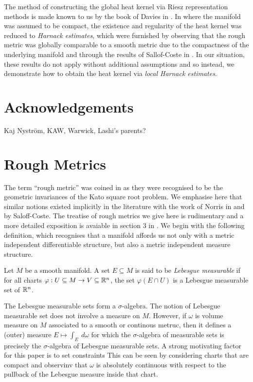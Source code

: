 \documentclass[a4paper, 12pt]{amsart}
\newcommand{\Bk}{\color{black}}
\newcommand{\Rd}{\color{red}}
\begin{document}
The method of constructing the global heat kernel
via Riesz representation methods is made known to us by
the book of Davies in \cite{Davies}.
In \cite{BCont} where the manifold was assumed to be compact, 
the existence and regularity of the heat kernel was
reduced to \emph{Harnack estimates}, which were
furnished by observing that  
the rough metric was globally comparable to a smooth metric
due to the compactness of the underlying manifold and
through the  results of Sallof-Coste in \cite{SC}.
In our situation, these results do not apply without additional assumptions
and so instead, we demonstrate
how to obtain the heat kernel via \emph{local Harnack estimates}. 

\section*{Acknowledgements}

Kaj Nyström, KAW, Warwick, Lashi's parents? 

\section{Rough Metrics}
\label{sec:rough_metrics}

The term ``rough metric'' was coined in \cite{BRough} as they were 
recognised to be the geometric invariances of the Kato square root problem.
We emphasise here that similar notions existed implicitly in the 
literature with the work of Norris in \cite{Norris} 
and \cite{SC} by Saloff-Coste.
The treatise of rough metrics we give here is rudimentary and 
a more detailed exposition is avaiable in section 3 in \cite{BRough}. 
We begin with the following definition, which recognises
that a manifold affords us not only with a metric independent 
differentiable structure, but also a metric independent measure
structure.

\begin{defn}
Let \(M\) be a smooth manifold. A set \(E \subseteq M\) is said to be \emph{Lebesgue measurable} if for all charts \(\varphi : U \subseteq M \to V \subseteq \mathbb{R}^n\), the set \(\varphi(E \cap U)\) is a Lebesgue measurable set of \(\mathbb{R}^n\).
\end{defn}

\begin{rem}
The Lebesgue measurable sets form a \(\sigma\)-algebra. The notion of Lebesgue measurable set does not involve a measure on \(M\). 
However, if \(\omega\) is volume \Rd measure \Bk on \(M\) associated to a smooth or continous metruc, then it defines a (outer) measure \(E \mapsto \int_E\ d\omega\) for which the \(\sigma\)-algebra of measurable sets is precisely the \(\sigma\)-algebra of Lebesgue measurable sets.
A strong motivating factor for this paper is to set
constraints 
\Rd This can be seen by considering charts that are compact and observinv that \(\omega\) is absolutely continuous with respect to the pullback of the Lebesgue measure inside that chart. \Bk
\end{rem}
\end{document}
